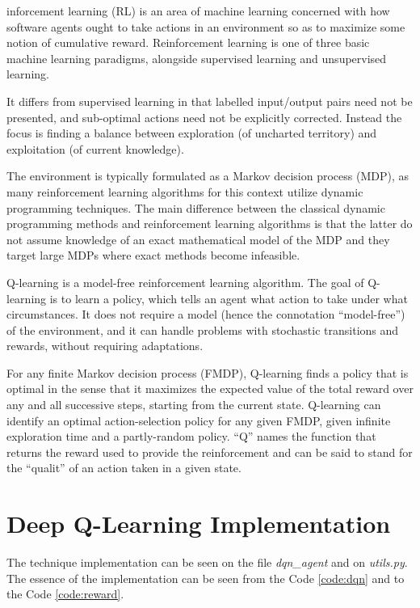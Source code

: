 \documentclass[journal]{IEEEtran}
\begin{document}
inforcement learning (RL) is an area of machine learning concerned with how software agents ought to take actions in an environment so as to maximize some notion of cumulative reward. Reinforcement learning is one of three basic machine learning paradigms, alongside supervised learning and unsupervised learning.

It differs from supervised learning in that labelled input/output pairs need not be presented, and sub-optimal actions need not be explicitly corrected. Instead the focus is finding a balance between exploration (of uncharted territory) and exploitation (of current knowledge).

The environment is typically formulated as a Markov decision process (MDP), as many reinforcement learning algorithms for this context utilize dynamic programming techniques. The main difference between the classical dynamic programming methods and reinforcement learning algorithms is that the latter do not assume knowledge of an exact mathematical model of the MDP and they target large MDPs where exact methods become infeasible.

Q-learning is a model-free reinforcement learning algorithm. The goal of Q-learning is to learn a policy, which tells an agent what action to take under what circumstances. It does not require a model (hence the connotation ``model-free'') of the environment, and it can handle problems with stochastic transitions and rewards, without requiring adaptations.

For any finite Markov decision process (FMDP), Q-learning finds a policy that is optimal in the sense that it maximizes the expected value of the total reward over any and all successive steps, starting from the current state. Q-learning can identify an optimal action-selection policy for any given FMDP, given infinite exploration time and a partly-random policy. ``Q'' names the function that returns the reward used to provide the reinforcement and can be said to stand for the ``qualit'' of an action taken in a given state.

\section{Deep Q-Learning Implementation}

The technique implementation can be seen on the file \textit{dqn\_agent} and on \textit{utils.py}. The essence of the implementation can be seen from the Code \ref{code:dqn} and to the Code \ref{code:reward}.
\end{document}
